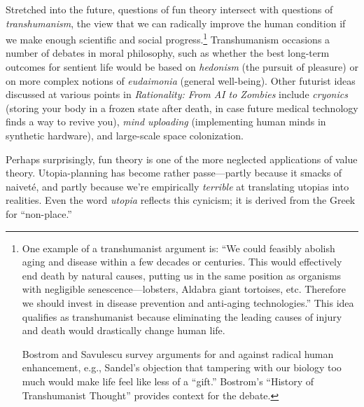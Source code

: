 {
 Stretched into the future, questions of fun theory intersect with
questions of \textit{transhumanism}, the view that we can radically
improve the human condition if we make enough scientific and social
progress.\footnote{One example of a transhumanist argument is:
``We could feasibly abolish aging and disease within a
few decades or centuries. This would effectively end death by natural
causes, putting us in the same position as organisms with negligible
senescence---lobsters, Aldabra giant tortoises, etc. Therefore we
should invest in disease prevention and anti-aging
technologies.'' This idea qualifies as transhumanist
because eliminating the leading causes of injury and death would
drastically change human life.

 Bostrom and Savulescu survey arguments for and against radical
human enhancement, e.g., Sandel's objection that
tampering with our biology too much would make life feel like less of a
``gift.''\footnotemark\supercomma\footnotemark
Bostrom's ``History of Transhumanist
Thought'' provides context for the
debate.\footnotemark{}}
\footnext{}
\footnext{}
\footnext{} Transhumanism occasions a number of
debates in moral philosophy, such as whether the best long-term
outcomes for sentient life would be based on \textit{hedonism} (the
pursuit of pleasure) or on more complex notions of \textit{eudaimonia}
(general well-being). Other futurist ideas discussed at various points
in \textit{Rationality: From AI to Zombies} include \textit{cryonics}
(storing your body in a frozen state after death, in case future
medical technology finds a way to revive you), \textit{mind uploading}
(implementing human minds in synthetic hardware), and large-scale space
colonization.}


 Perhaps surprisingly, fun theory is one of the more neglected
applications of value theory. Utopia-planning has become rather
passe---partly because it smacks of naiveté, and partly because
we're empirically \textit{terrible} at translating
utopias into realities. Even the word \textit{utopia} reflects this
cynicism; it is derived from the Greek for
``non-place.''


